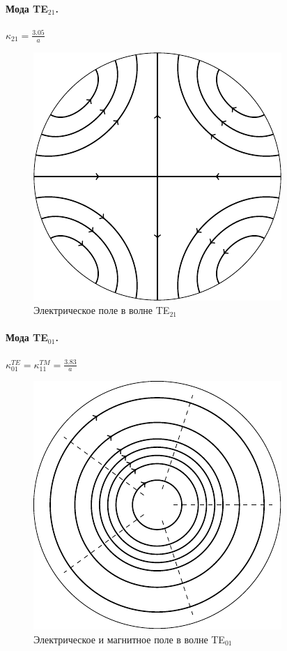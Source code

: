 \paragraph{Мода TE$_{21}$.} $\kappa_{21}=\frac{3.05}{a}$
\begin{figure}[H]
	\centering
	\includegraphics[scale=1.5]{img_lect5/cylindric/TE21}
	\caption{Электрическое поле в волне TE$_{21}$}
	\label{fig:cylinder:TE21}
\end{figure}

\paragraph{Мода TE$_{01}$.} $\kappa_{01}^{TE}=\kappa_{11}^{TM}=\frac{3.83}{a}$
\begin{figure}[H]
	\centering
	\includegraphics[scale=1.5]{img_lect5/cylindric/TE01}
	\caption{Электрическое и магнитное поле в волне TE$_{01}$}
	\label{fig:cylinder:TE01}
\end{figure}
\newpage
